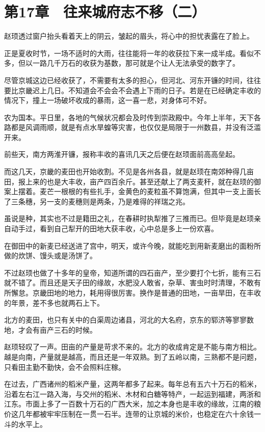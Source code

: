 \section{第17章　往来城府志不移（二）}

赵顼透过窗户抬头看着天上的阴云，皱起的眉头，将心中的担忧表露在了脸上。

正是夏收时节，一场不适时的大雨，往往能将一年的收获拉下来一成半成。看似不多，但以一路几千万石的收获为基数，那可就是个让人无法承受的数字了。 

尽管京城这边已经收获了，不需要有太多的担心，但河北、河东开镰的时间，往往要比京畿迟上几日。不知道会不会会不会遇上下雨的日子。若是在已经确定丰收的情况下，撞上一场破坏收成的暴雨，这一喜一悲，对身体可不好。 

农为国本。平日里，各地的气候状况都会及时传到崇政殿中。今年上半年，天下各路都是风调雨顺，就是有点水旱蝗等灾害，也仅仅是局限于一州数县，并没有泛滥开来。 

前些天，南方两淮开镰，报称丰收的喜讯几天之后便在赵顼面前高高垒起。 

而这几天，京畿的麦田也开始收割。不见是各州各县，就是赵顼在南郊种得几亩田，报上来的也是大丰收，亩产四百余斤。甚至还献上了两支麦秆，就在赵顼的御案上摆着。麦芒一根根的有些扎手，金黄色的麦粒虽不算饱满，但其中一支上面长了三条穗，另一支的麦穗则是两条，乃是难得的祥瑞之兆。 

虽说是种，其实也不过是籍田之礼，在春耕时执犁推了三推而已。但毕竟是赵顼亲自动手过，看到自己犁开的田地大获丰收，心中总是多上一份欢喜。 

在御田中的新麦已经送进了宫中，明天，或许今晚，就能吃到用新麦磨出的面粉所做的炊饼、馒头或是汤饼了。 

不过赵顼也做了十多年的皇帝，知道所谓的四石亩产，至少要打个七折，能有三石就不错了。而且还是天子田的缘故，水肥没人敢省，杂草、害虫时时清理，不敢有所懈怠。京畿田地的地力，耗用得很厉害。换作是普通的田地，一亩旱田，在丰收的年景，差不多也就两石上下。 

北方的麦田，也只有关中的白渠周边诸县，河北的大名府，京东的郓济等寥寥数地，才会有亩产三石的时候。 

赵顼轻叹了一声。田亩的产量是苛求不来的。北方的收成肯定是不能与南方相比。越是向南，产量就是越高，而且还是一年双熟。到了五岭以南，三熟都不是问题，只看田主勤不勤快，会不会照料庄稼。 

在过去，广西诸州的稻米产量，这两年都多了起来。每年总有五六十万石的稻米，沿着左右江一路入海，与交州的稻米、木材和白糖等特产，一起运到福建，两浙和江东。市面上多了一百数十万石的广西大米，加之本身也是丰收的缘故，江南的粮价这几年都被牢牢压制在一贯一石半。连带的让京城的米价，也稳定在六十余钱一斗的水平上。 

